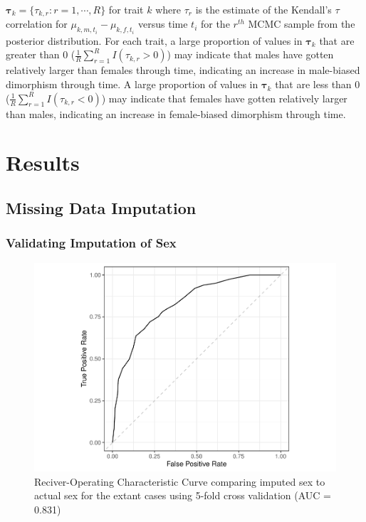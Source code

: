 \documentclass[
  12pt,
]{article}
\begin{document}
\(\boldsymbol{\tau}_k = \{\tau_{k,r}: r = 1,\cdots,R\}\) for trait \(k\)
where \(\tau_r\) is the estimate of the Kendall's \(\tau\) correlation
for \(\mu_{k,m,t_i} - \mu_{k,f,t_i}\) versus time \(t_i\) for the
\(r^{th}\) MCMC sample from the posterior distribution. For each trait,
a large proportion of values in \(\boldsymbol{\tau}_k\) that are greater
than 0 (\(\frac{1}{R} \sum_{r=1}^R I(\tau_{k,r} > 0)\)) may indicate
that males have gotten relatively larger than females through time,
indicating an increase in male-biased dimorphism through time. A large
proportion of values in \(\boldsymbol{\tau}_k\) that are less than 0
(\(\frac{1}{R} \sum_{r=1}^R I(\tau_{k,r} < 0)\)) may indicate that
females have gotten relatively larger than males, indicating an increase
in female-biased dimorphism through time.

\hypertarget{sec:results}{%
\section{Results}\label{sec:results}}

\hypertarget{missing-data-imputation}{%
\subsection{Missing Data Imputation}\label{missing-data-imputation}}

\hypertarget{validating-imputation-of-sex}{%
\subsubsection{Validating Imputation of
Sex}\label{validating-imputation-of-sex}}

\begin{figure}

{\centering \includegraphics{paper_files/figure-latex/roc-1} 

}

\caption{Reciver-Operating Characteristic Curve comparing imputed sex to actual sex for the extant cases using 5-fold cross validation (AUC = 0.831)}\label{fig:roc}
\end{figure}
\end{document}

